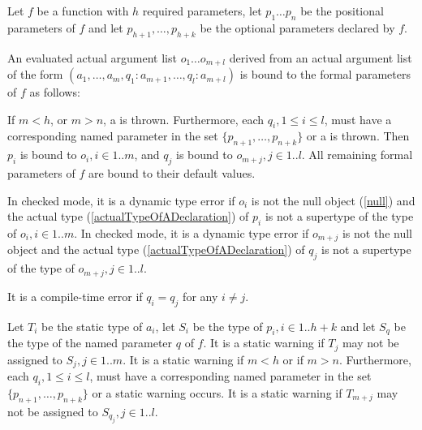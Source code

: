 \documentclass{article}
\begin{document}
\LMHash{}
Let $f$ be a function with $h$ required parameters, let $p_1 \ldots p_n$ be the positional parameters of $f$ and let $p_{h+1}, \ldots, p_{h+k}$ be the optional parameters declared by $f$.

\LMHash{}
An evaluated actual argument list $o_1 \ldots o_{m+l}$ derived from an actual argument list of the form $(a_1, \ldots, a_m, q_1: a_{m+1}, \ldots, q_l: a_{m+l})$ is bound to the formal parameters of $f$ as follows:



\LMHash{}
If $m < h$, or $m > n$, a  is thrown.
Furthermore, each $q_i, 1 \le i \le l$, must have a corresponding named parameter in the set $\{p_{n+1}, \ldots, p_{n +k}\}$ or a  is thrown.
Then $p_i$ is bound to $o_i, i \in 1 .. m$, and $q_j$ is bound to $o_{m+j}, j \in 1 .. l$.
All remaining formal parameters of $f$ are bound to their default values.


\LMHash{}
In checked mode, it is a dynamic type error if $o_i$ is not the null object (\ref{null}) and the actual type (\ref{actualTypeOfADeclaration}) of $p_i$ is not a supertype of the type of $o_i, i \in 1 .. m$.
In checked mode, it is a dynamic type error if $o_{m+j}$ is not the null object and the actual type (\ref{actualTypeOfADeclaration}) of $q_j$ is not a supertype of the type of $o_{m+j}, j \in 1 .. l$.

\LMHash{}
It is a compile-time error if $q_i = q_j$ for any $i \ne j$.

\LMHash{}
Let $T_i$ be the static type of $a_i$, let $S_i$ be the type of $p_i, i \in 1 .. h+k$ and let $S_q$ be the type of the named parameter $q$ of $f$.
It is a static warning if $T_j$ may not be assigned to $S_j, j \in 1..m$.
It is a static warning if $m < h$ or if $m > n$.
Furthermore, each $q_i, 1 \le i \le l$, must have a corresponding named parameter in the set $\{p_{n+1}, \ldots, p_{n +k}\}$ or a static warning occurs.
It is a static warning if $T_{m+j}$ may not be assigned to $S_{q_j}, j \in 1 .. l$.
\end{document}
